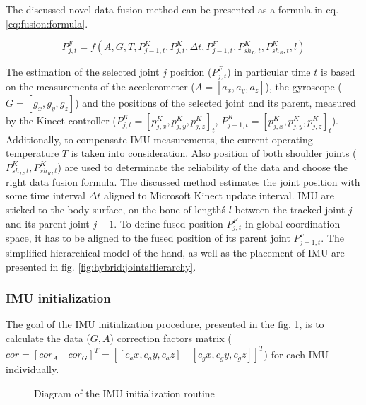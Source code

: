 \documentclass[sensors,article,submit,moreauthors,pdftex,10pt,a4paper]{mdpi}
\begin{document}
	The discussed novel data fusion method can be presented as a formula in eq. \ref{eq:fusion:formula}.
		
	\begin{equation}
		P^F_{j,t} = f(A,G,T,P_{j-1,t}^K,P_{j,t}^K,\Delta t, P^F_{j-1,t}, P^K_{sh_L,t},P^K_{sh_R,t},l) 
		\label{eq:fusion:formula}
	\end{equation}
		
	The estimation of the selected joint $j$ position ($P^F_{j,t}$) in particular time $t$ is based on the measurements of the accelerometer ($A=[a_x,a_y,a_z]$), the gyroscope ($G=[g_x,g_y,g_z]$) and the positions of the selected joint and its parent, measured by the Kinect controller ($P^K_{j,t} = [p^K_{j,x}, p^K_{j,y}, p^K_{j,z}]_t$, $P^K_{j-1,t} = [p^K_{j,x}, p^K_{j,y}, p^K_{j,z}]_t$). Additionally, to compensate IMU measurements, the current operating temperature $T$ is taken into consideration. Also position of both shoulder joints ($ P^K_{sh_L,t},P^K_{sh_R,t}$) are used to determinate the reliability of the data and choose the right data fusion formula. The discussed method estimates the joint position with some time interval $\Delta t$ aligned to Microsoft Kinect update interval. IMU are sticked to the body surface, on the bone of lengthś $l$ between the tracked joint $j$ and its parent joint $j-1$. To define fused position $P^F_{j,t}$ in global coordination space, it has to be aligned to the fused position of its parent joint $P^F_{j-1,t}$. The simplified hierarchical model of the hand, as well as the placement of IMU are presented in fig. \ref{fig:hybrid:jointsHierarchy}.	
		
	\subsubsection{IMU initialization}
	The goal of the IMU initialization procedure, presented in the fig. \ref{fig:hybrid:IMUCalibration}, is to calculate the data ($G, A$) correction factors matrix ($cor = [cor_A \quad cor_G]^T = [[c_ax,c_ay,c_az ]\quad[c_gx,c_gy,c_gz ]]^T $) for each IMU individually. 
	
	\begin{figure}[!htb] %
		\scalebox{0.55}{		
			
		}
		\caption{Diagram of the IMU initialization routine}
		\label{fig:hybrid:IMUCalibration}
	\end{figure}
	
\end{document}
